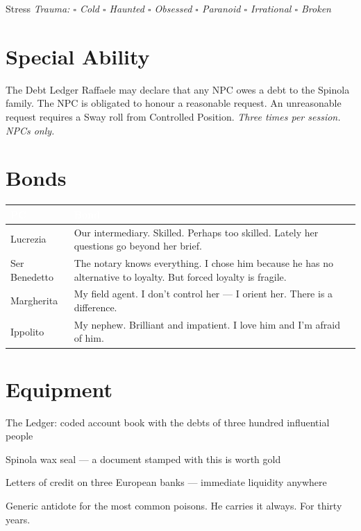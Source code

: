 \medskip
\begin{pgclockbox}{Stress \hfill {}}
\small\textit{Trauma: $\square$ Cold \quad $\square$ Haunted \quad $\square$ Obsessed \quad $\square$ Paranoid \quad $\square$ Irrational \quad $\square$ Broken}
\end{pgclockbox}

\section*{Special Ability}
\begin{spinolabox}{The Debt Ledger}
Raffaele may declare that any NPC owes a debt to the Spinola family. The NPC is
obligated to honour a reasonable request. An unreasonable request requires a Sway
roll from Controlled Position. \textit{Three times per session. NPCs only.}
\end{spinolabox}

\section*{Bonds}
\begin{table}[h]\centering\renewcommand{\arraystretch}{1.4}
\begin{tabularx}{\linewidth}{@{}L{2.6cm} X@{}}
\toprule{}
\textcolor{white}{\textbf{PC}} & \textcolor{white}{\textbf{Bond}} \\
\midrule
Lucrezia & Our intermediary. Skilled. Perhaps too skilled. Lately her questions go beyond her brief. \\
Ser Benedetto & The notary knows everything. I chose him because he has no alternative to loyalty. But forced loyalty is fragile. \\
Margherita & My field agent. I don't control her --- I orient her. There is a difference. \\
Ippolito & My nephew. Brilliant and impatient. I love him and I'm afraid of him. \\
\bottomrule
\end{tabularx}
\end{table}

\section*{Equipment}
\begin{goldlist}
\item The Ledger: coded account book with the debts of three hundred influential people
\item Spinola wax seal --- a document stamped with this is worth gold
\item Letters of credit on three European banks --- immediate liquidity anywhere
\item Generic antidote for the most common poisons. He carries it always. For thirty years.
\end{goldlist}

